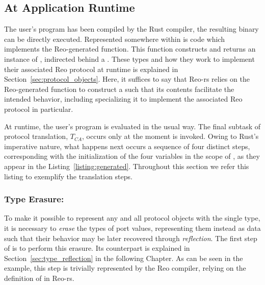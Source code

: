 
\subsection{At Application Runtime}
\label{sec:translation_phase_2}

The user's program has been compiled by the Rust compiler, the resulting binary can be directly executed. Represented somewhere within is code which implements the Reo-generated  function. This function constructs and returns an instance of , indirected behind a . These types and how they work to implement their associated Reo protocol at runtime is explained in Section~\ref{sec:protocol_objects}. Here, it suffices to say that Reo-rs relies on the Reo-generated  function to construct a  such that its contents facilitate the intended behavior, including specializing it to implement the associated Reo protocol in particular.

At runtime, the user's program is evaluated in the usual way. The final subtask of protocol translation, $T_{CA}$, occurs only at the moment  is invoked. Owing to Rust's imperative nature, what happens next occurs a sequence of four distinct steps, corresponding with the initialization of the four variables in the scope of , as they appear in the Listing~\ref{listing:generated}. Throughout this section we refer this listing to exemplify the translation steps.

\subsubsection{Type Erasure: }
To make it possible to represent any and all protocol objects with the single  type, it is necessary to \textit{erase} the types of port values, representing them instead as data such that their behavior may be later recovered through \textit{reflection}. The first step of  is to perform this erasure. Its counterpart is explained in Section~\ref{sec:type_reflection} in the following Chapter. As can be seen in the example, this step is trivially represented by the Reo compiler, relying on the definition of  in Reo-rs.

